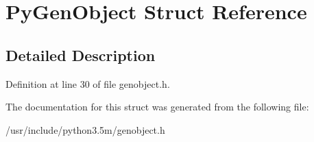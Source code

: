 \hypertarget{structPyGenObject}{}\section{Py\+Gen\+Object Struct Reference}
\label{structPyGenObject}


\subsection{Detailed Description}


Definition at line 30 of file genobject.\+h.



The documentation for this struct was generated from the following file\+:\begin{DoxyCompactItemize}
\item 
/usr/include/python3.\+5m/genobject.\+h\end{DoxyCompactItemize}
